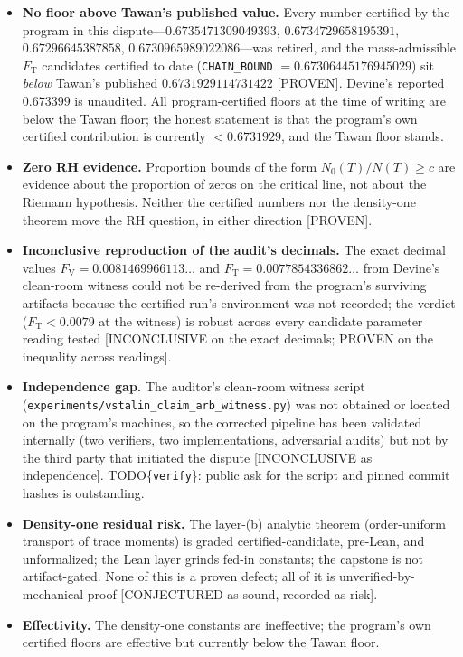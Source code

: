 \documentclass[11pt]{article}
\newcommand{\Fv}{F_{\mathrm{V}}}
\newcommand{\Ft}{F_{\mathrm{T}}}
\begin{document}
\begin{itemize}
\item \textbf{No floor above Tawan's published value.} Every number certified
  by the program in this dispute---$0.6735471309049393$, %
  $0.6734729658195391$, $0.67296645387858$, $0.6730965989022086$---was retired,
  and the mass-admissible $\Ft$ candidates certified to date
  (\texttt{CHAIN\_BOUND} $= 0.67306445176945029$) sit \emph{below} Tawan's
  published $0.6731929114731422$ [PROVEN]. Devine's reported $0.673399$ is
  unaudited. All program-certified floors at the time of writing are below the
  Tawan floor; the honest statement is that the program's own certified
  contribution is currently $< 0.6731929$, and the Tawan floor stands.
\item \textbf{Zero RH evidence.} Proportion bounds of the form
  $N_0(T)/N(T) \ge c$ are evidence about the proportion of zeros on the
  critical line, not about the Riemann hypothesis. Neither the certified
  numbers nor the density-one theorem move the RH question, in either
  direction [PROVEN].
\item \textbf{Inconclusive reproduction of the audit's decimals.} The exact
  decimal values $\Fv = 0.0081469966113\ldots$ and $\Ft = 0.0077854336862\ldots$
  from Devine's clean-room witness could not be re-derived from the program's
  surviving artifacts because the certified run's environment was not recorded;
  the verdict ($\Ft < 0.0079$ at the witness) is robust across every candidate
  parameter reading tested [INCONCLUSIVE on the exact decimals; PROVEN on the
  inequality across readings].
\item \textbf{Independence gap.} The auditor's clean-room witness script
  (\texttt{experiments/vstalin\_claim\_arb\_witness.py}) was not obtained or
  located on the program's machines, so the corrected pipeline has been
  validated internally (two verifiers, two implementations, adversarial audits)
  but not by the third party that initiated the dispute [INCONCLUSIVE as
  independence]. TODO\{\texttt{verify}\}: public ask for the script and pinned
  commit hashes is outstanding.
\item \textbf{Density-one residual risk.} The layer-(b) analytic theorem
  (order-uniform transport of trace moments) is graded certified-candidate,
  pre-Lean, and unformalized; the Lean layer grinds fed-in constants; the
  capstone is not artifact-gated. None of this is a proven defect; all of it is
  unverified-by-mechanical-proof [CONJECTURED as sound, recorded as risk].
\item \textbf{Effectivity.} The density-one constants are ineffective; the
  program's own certified floors are effective but currently below the Tawan
  floor.
\end{itemize}
\end{document}
